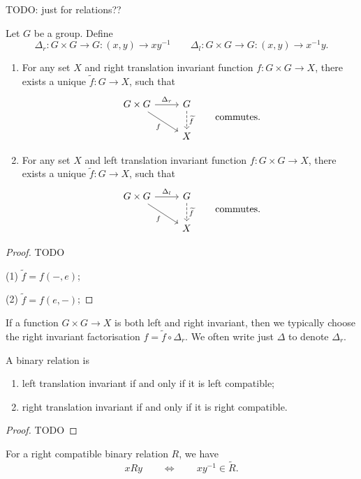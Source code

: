 TODO: just for relations??
\begin{proposition}
Let $G$ be a group. Define
\[ \Delta_r:G\times G\to G: (x,y) \to xy^{-1} \qquad \Delta_l:G\times G\to G: (x,y) \to x^{-1}y. \]
\begin{enumerate}
\item For any set $X$ and right translation invariant function $f:G\times G\to X$, there exists a unique $\widetilde{f}: G\to X$, such that
\[ \begin{tikzcd}
G\times G \rar{\Delta_r} \ar[dr, swap, "{f}"] & G \dar[dashed]{\widetilde{f}} \\
 & X
\end{tikzcd} \qquad\text{commutes.} \]
\item For any set $X$ and left translation invariant function $f:G\times G\to X$, there exists a unique $\widetilde{f}: G\to X$, such that
\[ \begin{tikzcd}
G\times G \rar{\Delta_l} \ar[dr, swap, "{f}"] & G \dar[dashed]{\widetilde{f}} \\
 & X
\end{tikzcd} \qquad\text{commutes.} \]
\end{enumerate}
\end{proposition}
\begin{proof}
TODO

(1) $\widetilde{f} = f(-, e)$;

(2) $\widetilde{f} = f(e, -)$;
\end{proof}

If a function $G\times G\to X$ is both left and right invariant, then we typically choose the right invariant factorisation $f = \widetilde{f}\circ \Delta_r$. We often write just $\Delta$ to denote $\Delta_r$.

\begin{lemma}
A binary relation is
\begin{enumerate}
\item left translation invariant \textup{if and only if} it is left compatible;
\item right translation invariant \textup{if and only if} it is right compatible.
\end{enumerate}
\end{lemma}
\begin{proof}
TODO
\end{proof}

For a right compatible binary relation $R$, we have
\[ xRy \qquad\iff\qquad xy^{-1} \in \widetilde{R}. \]

